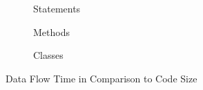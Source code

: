 \documentclass[../draft.tex]{subfiles}
\begin{document}
    \begin{figure}[tbp]
        \centering
        \begin{subfigure}[b]{\textwidth}
            \centering
            \begin{subfigure}[]{0.45\textwidth}
                \centering
                \resizebox{\columnwidth}{!}{
                    
                }
            \end{subfigure}
            \qquad
            \begin{subfigure}[]{0.45\textwidth}
                \centering
                \resizebox{\columnwidth}{!}{
                    
                }
            \end{subfigure}
            \caption{Statements}
        \end{subfigure}
        \bigbreak
        \begin{subfigure}[b]{\textwidth}
            \centering
            \begin{subfigure}[]{0.45\textwidth}
                \centering
                \resizebox{\columnwidth}{!}{
                    
                }
            \end{subfigure}
            \qquad
            \begin{subfigure}[]{0.45\textwidth}
                \centering
                \resizebox{\columnwidth}{!}{
                    
                }
            \end{subfigure}
            \caption{Methods}
        \end{subfigure}
        \bigbreak
        \begin{subfigure}[b]{\textwidth}
            \centering
            \begin{subfigure}[]{0.45\textwidth}
                \centering
                \resizebox{\columnwidth}{!}{
                    
                }
            \end{subfigure}
            \qquad
            \begin{subfigure}[]{0.45\textwidth}
                \centering
                \resizebox{\columnwidth}{!}{
                    
                }
            \end{subfigure}
            \caption{Classes}
        \end{subfigure}
        \caption{Data Flow Time in Comparison to Code Size}
        \label{f:dftocodesize}
    \end{figure}
\end{document}
